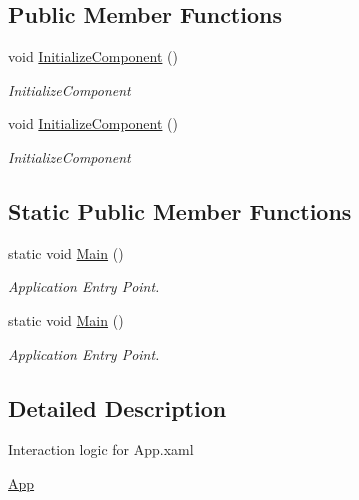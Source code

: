 \subsection*{Public Member Functions}
\begin{DoxyCompactItemize}
\item 
void \hyperlink{class_m_b_c_1_1_app_1_1_w_p_f_1_1_app_a8358577b4bcee12163c3027a479c5e52}{Initialize\-Component} ()
\begin{DoxyCompactList}\small\item\em Initialize\-Component \end{DoxyCompactList}\item 
void \hyperlink{class_m_b_c_1_1_app_1_1_w_p_f_1_1_app_a8358577b4bcee12163c3027a479c5e52}{Initialize\-Component} ()
\begin{DoxyCompactList}\small\item\em Initialize\-Component \end{DoxyCompactList}\end{DoxyCompactItemize}
\subsection*{Static Public Member Functions}
\begin{DoxyCompactItemize}
\item 
static void \hyperlink{class_m_b_c_1_1_app_1_1_w_p_f_1_1_app_aadd77cf730414325a01a554bea4a5091}{Main} ()
\begin{DoxyCompactList}\small\item\em Application Entry Point. \end{DoxyCompactList}\item 
static void \hyperlink{class_m_b_c_1_1_app_1_1_w_p_f_1_1_app_aadd77cf730414325a01a554bea4a5091}{Main} ()
\begin{DoxyCompactList}\small\item\em Application Entry Point. \end{DoxyCompactList}\end{DoxyCompactItemize}


\subsection{Detailed Description}
Interaction logic for App.\-xaml 

\hyperlink{class_m_b_c_1_1_app_1_1_w_p_f_1_1_app}{App} 

